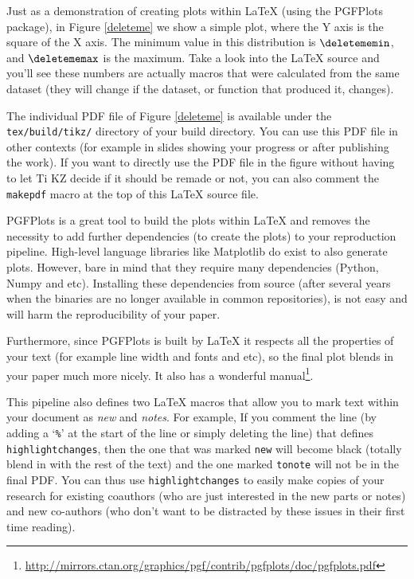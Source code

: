 \documentclass[10pt, twocolumn]{article}
\begin{document}
Just as a demonstration of creating plots within \LaTeX{} (using the
{\small PGFP}lots package), in Figure \ref{deleteme} we show a simple
plot, where the Y axis is the square of the X axis. The minimum value
in this distribution is $\deletememin$, and $\deletememax$ is the
maximum. Take a look into the \LaTeX{} source and you'll see these
numbers are actually macros that were calculated from the same dataset
(they will change if the dataset, or function that produced it,
changes).

The individual {\small PDF} file of Figure \ref{deleteme} is available
under the \texttt{tex/build/tikz/} directory of your build directory. You
can use this PDF file in other contexts (for example in slides showing your
progress or after publishing the work). If you want to directly use the
{\small PDF} file in the figure without having to let {\small T}i{\small
  KZ} decide if it should be remade or not, you can also comment the
\texttt{makepdf} macro at the top of this \LaTeX{} source file.

{\small PGFP}lots is a great tool to build the plots within \LaTeX{} and
removes the necessity to add further dependencies (to create the plots) to
your reproduction pipeline. High-level language libraries like Matplotlib
do exist to also generate plots. However, bare in mind that they require
many dependencies (Python, Numpy and etc). Installing these dependencies
from source (after several years when the binaries are no longer available
in common repositories), is not easy and will harm the reproducibility of
your paper.

\begin{figure}[t]

\end{figure}

Furthermore, since {\small PGFP}lots is built by \LaTeX{} it respects all
the properties of your text (for example line width and fonts and etc), so
the final plot blends in your paper much more nicely. It also has a
wonderful
manual\footnote{\url{http://mirrors.ctan.org/graphics/pgf/contrib/pgfplots/doc/pgfplots.pdf}}.

This pipeline also defines two \LaTeX{} macros that allow you to mark text
within your document as \emph{new} and \emph{notes}. For example,   If you comment the line (by adding a `\texttt{\%}'
at the start of the line or simply deleting the line) that defines
\texttt{highlightchanges}, then the one that was marked \texttt{new} will
become black (totally blend in with the rest of the text) and the one
marked \texttt{tonote} will not be in the final PDF. You can thus use
\texttt{highlightchanges} to easily make copies of your research for
existing coauthors (who are just interested in the new parts or notes) and
new co-authors (who don't want to be distracted by these issues in their
first time reading).
\end{document}
